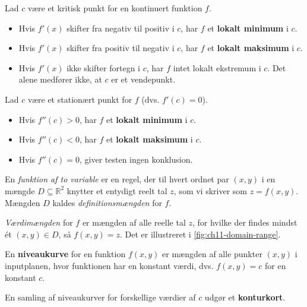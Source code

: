\begin{theorem}
    Lad \(c\) være et kritisk punkt for en kontinuert funktion \(f\).
    \begin{itemize}
        \item Hvis \(f'(x)\) skifter fra negativ til positiv i \(c\), har \(f\) et \textbf{lokalt minimum} i \(c\).
        \item Hvis \(f'(x)\) skifter fra positiv til negativ i \(c\), har \(f\) et \textbf{lokalt maksimum} i \(c\).
        \item Hvis \(f'(x)\) ikke skifter fortegn i \(c\), har \(f\) intet lokalt ekstremum i \(c\). Det alene medfører ikke, at $c$ er et vendepunkt.
    \end{itemize}

\end{theorem}

\begin{theorem}
    Lad \(c\) være et stationært punkt for \(f\) (dvs. \(f'(c) = 0\)).
    \begin{itemize}
        \item Hvis \(f''(c) > 0\), har \(f\) et \textbf{lokalt minimum} i \(c\).
        \item Hvis \(f''(c) < 0\), har \(f\) et \textbf{lokalt maksimum} i \(c\).
        \item Hvis \(f''(c) = 0\), giver testen ingen konklusion.
    \end{itemize}
\end{theorem}


\begin{definition}
En \emph{funktion af to variable} er en regel, der til hvert ordnet par \((x, y)\) i en mængde \(D \subseteq \mathbb{R}^2\) knytter et entydigt reelt tal \(z\), som vi skriver som \(z = f(x, y)\). Mængden \(D\) kaldes \emph{definitionsmængden} for \(f\).

\emph{Værdimængden} for \(f\) er mængden af alle reelle tal \(z\), for hvilke der findes mindst ét \((x, y) \in D\), så \(f(x, y) = z\). Det er illustreret i \autoref{fig:ch11-domain-range}.
\end{definition}

\begin{definition}
En \textbf{niveaukurve} for en funktion \(f(x, y)\) er mængden af alle punkter \((x, y)\) i inputplanen, hvor funktionen har en konstant værdi, dvs. \(f(x, y) = c\) for en konstant \(c\).

En samling af niveaukurver for forskellige værdier af \(c\) udgør et \textbf{konturkort}.
\end{definition}

